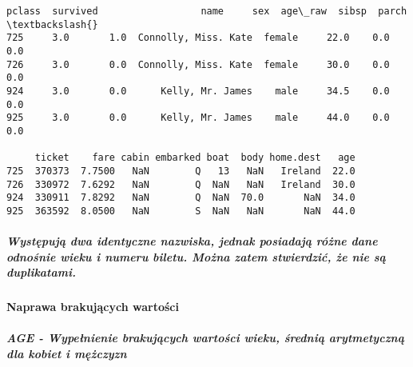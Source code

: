 \documentclass[11pt]{article}
\makeatletter
\newcommand{\boxspacing}{\kern\kvtcb@left@rule\kern\kvtcb@boxsep}
\newcommand{\prompt}[4]{
        {\ttfamily\llap{{\color{#2}[#3]:\hspace{3pt}#4}}\vspace{-\baselineskip}}
    }
\makeatother
\begin{document}
            \begin{tcolorbox}[breakable, size=fbox, boxrule=.5pt, pad at break*=1mm, opacityfill=0]
\prompt{Out}{outcolor}{101}{\boxspacing}
\begin{Verbatim}[commandchars=\\\{\}]
     pclass  survived                  name     sex  age\_raw  sibsp  parch  \textbackslash{}
725     3.0       1.0  Connolly, Miss. Kate  female     22.0    0.0    0.0
726     3.0       0.0  Connolly, Miss. Kate  female     30.0    0.0    0.0
924     3.0       0.0      Kelly, Mr. James    male     34.5    0.0    0.0
925     3.0       0.0      Kelly, Mr. James    male     44.0    0.0    0.0

     ticket    fare cabin embarked boat  body home.dest   age
725  370373  7.7500   NaN        Q   13   NaN   Ireland  22.0
726  330972  7.6292   NaN        Q  NaN   NaN   Ireland  30.0
924  330911  7.8292   NaN        Q  NaN  70.0       NaN  34.0
925  363592  8.0500   NaN        S  NaN   NaN       NaN  44.0
\end{Verbatim}
\end{tcolorbox}
        
    \subparagraph{Występują dwa identyczne nazwiska, jednak posiadają różne
dane odnośnie wieku i numeru biletu. Można zatem stwierdzić, że nie są
duplikatami.}\label{wystux119pujux105-dwa-identyczne-nazwiska-jednak-posiadajux105-ruxf3ux17cne-dane-odnoux15bnie-wieku-i-numeru-biletu.-moux17cna-zatem-stwierdziux107-ux17ce-nie-sux105-duplikatami.}

    \paragraph{Naprawa brakujących
wartości}\label{naprawa-brakujux105cych-wartoux15bci}

    \subparagraph{AGE - Wypełnienie brakujących wartości wieku, średnią
arytmetyczną dla kobiet i
mężczyzn}\label{age---wypeux142nienie-brakujux105cych-wartoux15bci-wieku-ux15bredniux105-arytmetycznux105-dla-kobiet-i-mux119ux17cczyzn}
\end{document}
